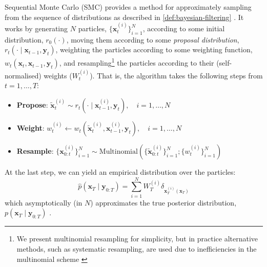 \begin{definition} \label{defn:smc}
    Sequential Monte Carlo (SMC) provides a method for approximately sampling from the sequence of
    distributions as described in \ref{def:bayesian-filtering}
    \parencite{chopinIntroductionSequentialMonte2020}. It works by generating $N$ particles,
    $\{\mathbf{x}_t^{(i)}\}_{i=1}^N$, according to some initial distribution, $r_0(\cdot)$,
    moving them according to some \emph{proposal distribution},
    $r_t(\cdot \mid \mathbf{x}_{t-1}, \mathbf{y}_{t})$, weighting the particles according to
    some weighting function, $w_t(\mathbf{x}_t, \mathbf{x}_{t-1}, \mathbf{y}_t)$, and
    resampling\footnote{We present multinomial resampling for simplicity, but in practice
    alternative methods, such as systematic resampling, are used due to inefficiencies in the
    multinomial scheme \parencite{chopinIntroductionSequentialMonte2020}} the particles according to
    their (self-normalised) weights ($W_t^{(i)}$). That is, the algorithm takes the following steps from
    $t=1,\ldots,T$:
    \begin{itemize}
        \item \textbf{Propose}: $\tilde{\mathbf{x}}_t^{(i)} \sim r_t(\cdot \mid \mathbf{x}_{t-1}^{(i)}, \mathbf{y}_t), \quad i = 1,\ldots,N$
        \item \textbf{Weight}: $w_t^{(i)} \leftarrow w_t(\tilde{\mathbf{x}}_t^{(i)}, \mathbf{x}_{t-1}^{(i)}, \mathbf{y}_t), \quad i = 1,\ldots,N$
        \item \textbf{Resample}: $\{\mathbf{x}_{0:t}^{(i)}\}_{i=1}^N \sim \text{Multinomial}\left(\{\tilde{\mathbf{x}}_{0:t}^{(i)}\}_{i=1}^N; \{w_t^{(i)}\}_{i=1}^N\right)$
    \end{itemize}
    At the last step, we can yield an empirical distribution over the particles:
    \begin{equation*}
        \hat{p}(\mathbf{x}_T \mid \mathbf{y}_{0:T}) = \sum_{i=1}^N W_{T}^{(i)}\delta_{\mathbf{x}_{T}^{(i)}(\mathbf{x}_T)}
    \end{equation*}
    which asymptotically (in $N$) approximates the true posterior distribution,
    $p(\mathbf{x}_T \mid \mathbf{y}_{0:T})$ \parencite{delmoralCentralLimitTheorems2011,chopinIntroductionSequentialMonte2020}.
\end{definition}

